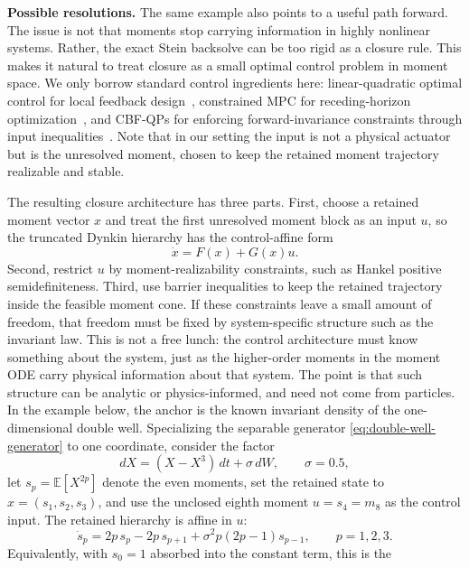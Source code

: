 \documentclass{article}
\theoremstyle{definition}
\begin{document}
\textbf{Possible resolutions.}
The same example also points to a useful path forward. The issue is not
that moments stop carrying information in highly nonlinear systems.
Rather, the exact Stein backsolve can be too rigid as a closure rule.
This makes it natural to treat closure as a small optimal control problem in
moment space. We only borrow standard control ingredients here:
linear-quadratic
optimal control for local feedback design~\cite{kalman1960optimal},
constrained MPC for receding-horizon optimization~\cite{mayne2000mpc},
and CBF-QPs for enforcing forward-invariance constraints through input
inequalities~\cite{ames2017cbf}. Note that in our setting the input is not a
physical actuator but is the unresolved moment, chosen to keep the
retained moment trajectory realizable and stable.

The resulting closure architecture has three parts. First, choose a
retained moment vector $x$ and treat the first unresolved moment block as
an input $u$, so the truncated Dynkin hierarchy has the control-affine
form
\begin{equation}\label{eq:closure-control-template}
  \dot{x}=F(x)+G(x)u.
\end{equation}
Second, restrict $u$ by moment-realizability constraints, such as Hankel
positive semidefiniteness. Third, use barrier inequalities to keep the
retained trajectory inside the feasible moment cone. If these constraints
leave a small amount of freedom, that freedom must be fixed by
system-specific structure such as the invariant law. This is not a
free lunch: the control architecture must know something about the
system, just as the higher-order moments in the moment ODE carry
physical information about that system. The point is that such structure can be analytic or
physics-informed, and need not come from particles. In the example
below, the anchor is the known invariant density of the one-dimensional
double well. Specializing the separable generator
\eqref{eq:double-well-generator} to one coordinate, consider the factor
\[
  dX = (X-X^3)\,dt + \sigma\,dW,
  \qquad \sigma=0.5,
\]
let $s_p=\mathbb{E}[X^{2p}]$ denote the even moments, set the retained
state to $x=(s_1,s_2,s_3)$, and use the unclosed eighth moment
$u=s_4=m_8$ as the control input. The retained
hierarchy is affine in $u$:
\begin{equation}\label{eq:dw-control-moments}
  \dot{s}_p =
  2p\,s_p - 2p\,s_{p+1}
  + \sigma^2 p(2p{-}1)s_{p-1},
  \qquad p=1,2,3.
\end{equation}
Equivalently, with $s_0=1$ absorbed into the constant term, this is the
\end{document}
